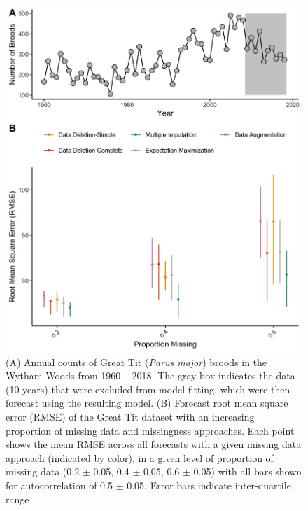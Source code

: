\documentclass{article}
\begin{document}
\begin{figure}
    \noindent\includegraphics[width = \textwidth]{Figures/MockedUpFigures/RMSE_pois_combined.png}
    \caption{(A) Annual counts of Great Tit (\textit{Parus major}) broods in the Wytham Woods from 1960 – 2018. The gray box indicates the data (10 years) that were excluded from model fitting, which were then forecast using the resulting model. (B) Forecast root mean square error (RMSE) of the Great Tit dataset with an increasing proportion of missing data and missingness approaches. Each point shows the mean RMSE across all forecasts with a given missing data approach (indicated by color), in a given level of proportion of missing data (0.2 $\pm$ 0.05, 0.4 $\pm$ 0.05, 0.6 $\pm$ 0.05) with all bars shown for autocorrelation of 0.5 $\pm$ 0.05. Error bars indicate inter-quartile range}
    \label{fig:RMSE_Poiss}
\end{figure}
\clearpage


\newpage




\newpage

%

\end{document}
